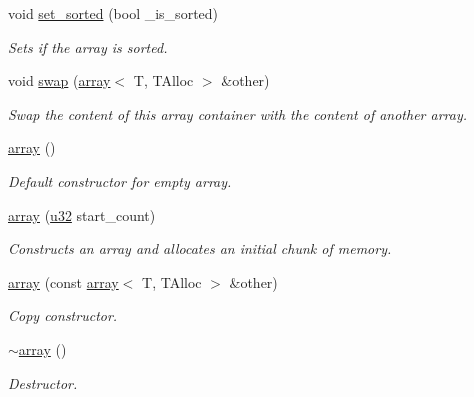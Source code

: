 \begin{DoxyCompactItemize}
\mbox{\label{classirr_1_1core_1_1array_ab73d5838db931996f66f9efcc7127b49}} 
void \hyperlink{classirr_1_1core_1_1array_ab73d5838db931996f66f9efcc7127b49}{set\+\_\+sorted} (bool \+\_\+is\+\_\+sorted)
\begin{DoxyCompactList}\small\item\em Sets if the array is sorted. \end{DoxyCompactList}\item 
void \hyperlink{classirr_1_1core_1_1array_a8857046f500a2990fc9930b204a3dbad}{swap} (\hyperlink{classirr_1_1core_1_1array}{array}$<$ T, T\+Alloc $>$ \&other)
\begin{DoxyCompactList}\small\item\em Swap the content of this array container with the content of another array. \end{DoxyCompactList}\item 
\mbox{\label{classirr_1_1core_1_1array_a5e0dd817352068af92448a08716f1252}} 
\hyperlink{classirr_1_1core_1_1array_a5e0dd817352068af92448a08716f1252}{array} ()
\begin{DoxyCompactList}\small\item\em Default constructor for empty array. \end{DoxyCompactList}\item 
\hyperlink{classirr_1_1core_1_1array_ab58c4b2c09693190b43ee16e99722b43}{array} (\hyperlink{namespaceirr_a0416a53257075833e7002efd0a18e804}{u32} start\+\_\+count)
\begin{DoxyCompactList}\small\item\em Constructs an array and allocates an initial chunk of memory. \end{DoxyCompactList}\item 
\mbox{\label{classirr_1_1core_1_1array_a4e584fd375dd5f994b6bd7afd7f7a60c}} 
\hyperlink{classirr_1_1core_1_1array_a4e584fd375dd5f994b6bd7afd7f7a60c}{array} (const \hyperlink{classirr_1_1core_1_1array}{array}$<$ T, T\+Alloc $>$ \&other)
\begin{DoxyCompactList}\small\item\em Copy constructor. \end{DoxyCompactList}\item 
\hyperlink{classirr_1_1core_1_1array_aac1853f45d4c18feaacac9859efe9836}{$\sim$array} ()
\begin{DoxyCompactList}\small\item\em Destructor. \end{DoxyCompactList}\item 

\end{DoxyCompactItemize}
